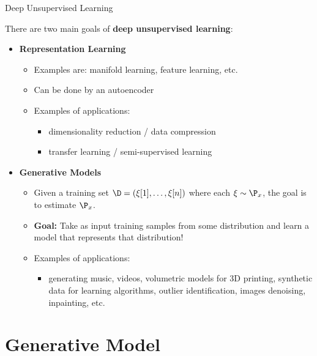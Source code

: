 \begin{frame} {Deep Unsupervised Learning}

There are two main goals of \textbf{deep unsupervised learning}:
    \begin{itemize}
\vspace{4mm}
\item \textbf{Representation Learning}
\begin{itemize}
\item Examples are: manifold learning, feature learning, etc.
\item Can be done by an autoencoder
\item Examples of applications:
    \begin{itemize}
\item dimensionality reduction / data compression
\item transfer learning / semi-supervised learning
\end{itemize}
\end{itemize}
\vspace{2mm}
\item \textbf{Generative Models }
\begin{itemize}
\item Given a training set $\D = (\xi[1], \ldots, \xi[n])$ where each $\xi \sim \P_x$, the goal is to estimate $\P_x$.
\item \textbf{Goal:} Take as input training samples from some distribution and learn a model that represents that distribution!
\item Examples of applications:
    \begin{itemize}
\item generating music, videos, volumetric models for 3D printing, synthetic data for learning algorithms, outlier identification, images denoising, inpainting, etc.
\end{itemize}
\end{itemize}
\end{itemize}
\end{frame}

\section{Generative Model}

